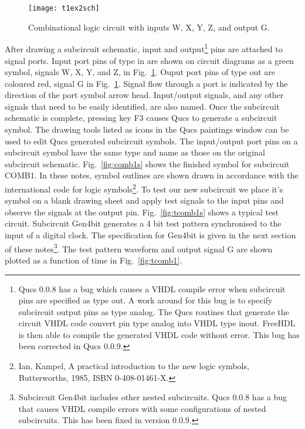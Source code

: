 \begin{figure}
  \centering
  \texttt{[image: t1ex2sch]}
  \caption{Combinational logic circuit with inputs W, X, Y, Z, and output G.}
  \label{fig:t1ex2sch}
\end{figure}

\addvspace{12pt}

After drawing a subcircuit schematic, input and output\footnote{Qucs
0.0.8 has a bug which causes a VHDL compile error when subcircuit pins
are specified as type out. A work around for this bug is to specify
subcircuit output pins as type analog.  The Qucs routines that
generate the circuit VHDL code convert pin type analog into VHDL type
inout. FreeHDL is then able to compile the generated VHDL code without
error. This bug has been corrected in Qucs 0.0.9.} pins are attached
to signal ports.  Input port pins of type in are shown on circuit
diagrams as a green symbol, signals W, X, Y, and Z, in
Fig.~\ref{fig:t1ex2sch}.  Ouput port pins of type out are coloured
red, signal G in Fig.~\ref{fig:t1ex2sch}. Signal flow through a port
is indicated by the direction of the port symbol arrow
head. Input/output signals, and any other signals that need to be
easily identified, are also named.  Once the subcircuit schematic is
complete, pressing key F3 causes Qucs to generate a subcircuit symbol.
The drawing tools listed as icons in the Qucs paintings window can be
used to edit Qucs generated subcircuit symbols.  The input/output port
pins on a subcircuit symbol have the same type and name as those on
the original subcircuit schematic.  Fig.~\ref{fig:comb1s} shows the
finished symbol for subcircuit COMB1. In these notes, symbol outlines
are shown drawn in accordance with the international code for logic
symbols\footnote{Ian, Kampel, A practical introduction to the new
logic symbols, Butterworths, 1985, ISBN 0-408-01461-X.}. To test our
new subcircuit we place it's symbol on a blank drawing sheet and apply
test signals to the input pins and observe the signals at the output
pin.  Fig.~\ref{fig:tcomb1s} shows a typical test circuit.  Subcircuit
Gen4bit generates a 4 bit test pattern synchronised to the input of a
digital clock. The specification for Gen4bit is given in the next
section of these notes\footnote{Subcircuit Gen4bit includes other
nested subcircuits.  Qucs 0.0.8 has a bug that causes VHDL compile
errors with some configurations of nested subcircuits. This has been
fixed in version 0.0.9. }.  The test pattern waveform and output
signal G are shown plotted as a function of time in
Fig.~\ref{fig:tcomb1}.

